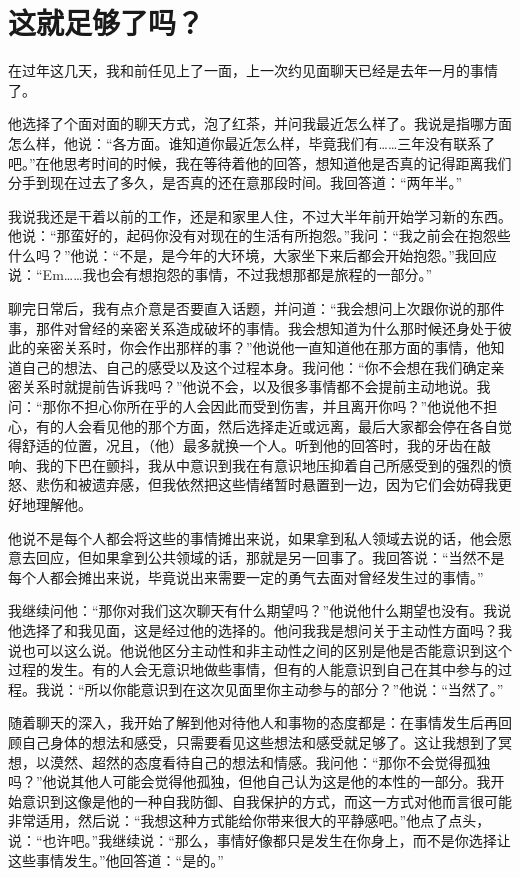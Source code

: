 \chapter{这就足够了吗？}





在过年这几天，我和前任见上了一面，上一次约见面聊天已经是去年一月的事情了。

他选择了个面对面的聊天方式，泡了红茶，并问我最近怎么样了。我说是指哪方面怎么样，他说：“各方面。谁知道你最近怎么样，毕竟我们有……三年没有联系了吧。”在他思考时间的时候，我在等待着他的回答，想知道他是否真的记得距离我们分手到现在过去了多久，是否真的还在意那段时间。我回答道：“两年半。”

我说我还是干着以前的工作，还是和家里人住，不过大半年前开始学习新的东西。他说：“那蛮好的，起码你没有对现在的生活有所抱怨。”我问：“我之前会在抱怨些什么吗？”他说：“不是，是今年的大环境，大家坐下来后都会开始抱怨。”我回应说：“Em……我也会有想抱怨的事情，不过我想那都是旅程的一部分。”


聊完日常后，我有点介意是否要直入话题，并问道：“我会想问上次跟你说的那件事，那件对曾经的亲密关系造成破坏的事情。我会想知道为什么那时候还身处于彼此的亲密关系时，你会作出那样的事？”他说他一直知道他在那方面的事情，他知道自己的想法、自己的感受以及这个过程本身。我问他：“你不会想在我们确定亲密关系时就提前告诉我吗？”他说不会，以及很多事情都不会提前主动地说。我问：“那你不担心你所在乎的人会因此而受到伤害，并且离开你吗？”他说他不担心，有的人会看见他的那个方面，然后选择走近或远离，最后大家都会停在各自觉得舒适的位置，况且，（他）最多就换一个人。听到他的回答时，我的牙齿在敲响、我的下巴在颤抖，我从中意识到我在有意识地压抑着自己所感受到的强烈的愤怒、悲伤和被遗弃感，但我依然把这些情绪暂时悬置到一边，因为它们会妨碍我更好地理解他。

他说不是每个人都会将这些的事情摊出来说，如果拿到私人领域去说的话，他会愿意去回应，但如果拿到公共领域的话，那就是另一回事了。我回答说：“当然不是每个人都会摊出来说，毕竟说出来需要一定的勇气去面对曾经发生过的事情。”


我继续问他：“那你对我们这次聊天有什么期望吗？”他说他什么期望也没有。我说他选择了和我见面，这是经过他的选择的。他问我我是想问关于主动性方面吗？我说也可以这么说。他说他区分主动性和非主动性之间的区别是他是否能意识到这个过程的发生。有的人会无意识地做些事情，但有的人能意识到自己在其中参与的过程。我说：“所以你能意识到在这次见面里你主动参与的部分？”他说：“当然了。”


随着聊天的深入，我开始了解到他对待他人和事物的态度都是：在事情发生后再回顾自己身体的想法和感受，只需要看见这些想法和感受就足够了。这让我想到了冥想，以漠然、超然的态度看待自己的想法和情感。我问他：“那你不会觉得孤独吗？”他说其他人可能会觉得他孤独，但他自己认为这是他的本性的一部分。我开始意识到这像是他的一种自我防御、自我保护的方式，而这一方式对他而言很可能非常适用，然后说：“我想这种方式能给你带来很大的平静感吧。”他点了点头，说：“也许吧。”我继续说：“那么，事情好像都只是发生在你身上，而不是你选择让这些事情发生。”他回答道：“是的。”

